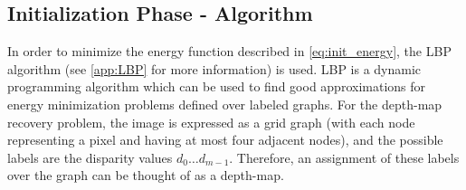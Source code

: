 \documentclass[notitlepage,english]{hgbreport}
\newcommand{\Acronym}[1]{{#1}}
\newcommand{\LBP}{\Acronym{LBP}}
\begin{document}
\subsection{Initialization Phase - Algorithm}\label{sec:init_phase_alg}
In order to minimize the energy function described in \cref{eq:init_energy}, the \LBP{} algorithm (see \cref{app:LBP} for more information) is used.
\LBP{} is a dynamic programming algorithm which can be used to find good approximations for energy minimization problems defined over labeled graphs.
For the depth-map recovery problem, the image is expressed as a grid graph (with each node representing a pixel and having at most four adjacent nodes), and the possible labels are the disparity values $d_0\dots d_{m-1}$. Therefore, an assignment of these labels over the graph can be thought of as a depth-map.
\end{document}
